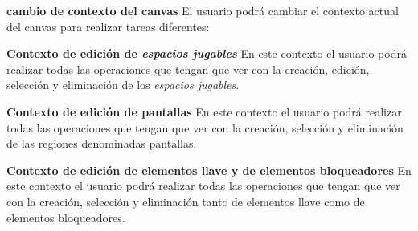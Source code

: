 	\item \textbf{cambio de contexto del canvas}\newline
		El usuario podrá cambiar el contexto actual del canvas para realizar tareas diferentes:
		\begin{functional}
			\item \textbf{Contexto de edición de \textit{espacios jugables}}\newline
				En este contexto el usuario podrá realizar todas las operaciones que tengan que ver con la creación, edición, selección y eliminación de los \textit{espacios jugables}.
			\item \textbf{Contexto de edición de pantallas}\newline
				En este contexto el usuario podrá realizar todas las operaciones que tengan que ver con la creación, selección y eliminación de las regiones denominadas pantallas.
			\item \textbf{Contexto de edición de elementos llave y de elementos bloqueadores}\newline
				En este contexto el usuario podrá realizar todas las operaciones que tengan que ver con la creación, selección y eliminación tanto de elementos llave como de elementos bloqueadores.
		\end{functional}
